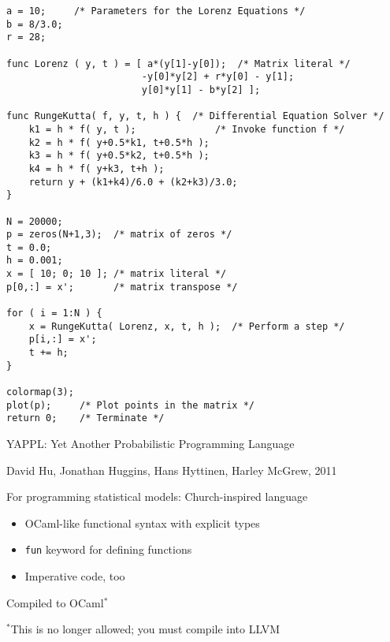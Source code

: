\documentclass{plt}
\begin{document}
\begin{frame}[fragile]

\footnotesize\baselineskip=7pt
\begin{verbatim}
a = 10;     /* Parameters for the Lorenz Equations */
b = 8/3.0;
r = 28;

func Lorenz ( y, t ) = [ a*(y[1]-y[0]);  /* Matrix literal */
                        -y[0]*y[2] + r*y[0] - y[1];
                        y[0]*y[1] - b*y[2] ];

func RungeKutta( f, y, t, h ) {  /* Differential Equation Solver */
    k1 = h * f( y, t );              /* Invoke function f */
    k2 = h * f( y+0.5*k1, t+0.5*h );
    k3 = h * f( y+0.5*k2, t+0.5*h );
    k4 = h * f( y+k3, t+h );
    return y + (k1+k4)/6.0 + (k2+k3)/3.0;
}

N = 20000;
p = zeros(N+1,3);  /* matrix of zeros */
t = 0.0;
h = 0.001;
x = [ 10; 0; 10 ]; /* matrix literal */
p[0,:] = x';       /* matrix transpose */
 
for ( i = 1:N ) {
    x = RungeKutta( Lorenz, x, t, h );  /* Perform a step */
    p[i,:] = x';
    t += h;
}
 
colormap(3);
plot(p);     /* Plot points in the matrix */
return 0;    /* Terminate */
\end{verbatim}

\end{frame}

\begin{frame}[fragile]{YAPPL: Yet Another Probabilistic Programming Language}

{\small David Hu, Jonathan Huggins, Hans Hyttinen, Harley McGrew, 2011}

For programming statistical models: Church-inspired language

\begin{itemize}
\item  OCaml-like functional syntax with explicit types
\item \verb|fun| keyword for defining functions
\item Imperative code, too
\end{itemize}

Compiled to OCaml$^*$

$^*$This is no longer allowed; you must compile into LLVM

\end{frame}
\end{document}

